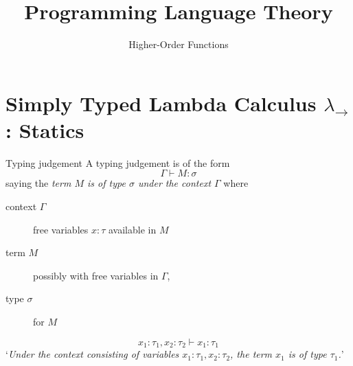 
\title{Programming Language Theory}
\subtitle{Higher-Order Functions}


{
\begin{frame}\maketitle\end{frame}}

\section{Simply Typed Lambda Calculus $\lambda_\to$: Statics}

\begin{frame}{Typing judgement}
  A \alert{typing judgement} is of the form
  \[
    \Gamma \vdash M : \sigma
  \]
  saying the \emph{term $M$ is of type $\sigma$ under the context $\Gamma$}
  where 
  \begin{description}
    \item[context $\Gamma$] free variables $x : \tau$ available in $M$
    \item[term $M$] possibly with free variables in $\Gamma$,
    \item[type $\sigma$] for $M$
  \end{description}

  \[
    x_1:\tau_1, x_2: \tau_2 \vdash x_1 : \tau_1
  \]
  `\emph{Under the context consisting of variables $x_1:\tau_1, x_2:\tau_2$, the term $x_1$ is of type $\tau_1$.}'
\end{frame}

